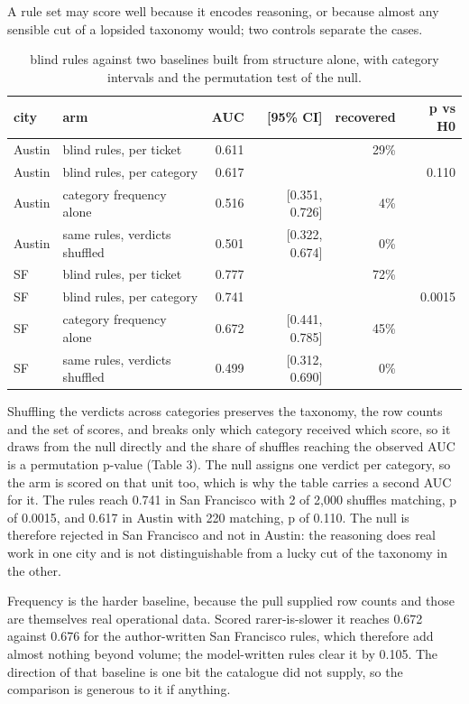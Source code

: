 \documentclass[10pt,a4paper,twocolumn]{article}
\begin{document}
A rule set may score well because it encodes reasoning, or because almost any
sensible cut of a lopsided taxonomy would; two controls separate the cases.

\begin{table}[t]
\centering
\footnotesize
\begin{tabular}{llrrrr}
\toprule
city & arm & AUC & [95\% CI] & recovered & p vs H0 \\
\midrule
Austin & blind rules, per ticket & 0.611 &  & 29\% &  \\
Austin & blind rules, per category & 0.617 &  &  & 0.110 \\
Austin & category frequency alone & 0.516 & [0.351, 0.726] & 4\% &  \\
Austin & same rules, verdicts shuffled & 0.501 & [0.322, 0.674] & 0\% &  \\
SF & blind rules, per ticket & 0.777 &  & 72\% &  \\
SF & blind rules, per category & 0.741 &  &  & 0.0015 \\
SF & category frequency alone & 0.672 & [0.441, 0.785] & 45\% &  \\
SF & same rules, verdicts shuffled & 0.499 & [0.312, 0.690] & 0\% &  \\
\bottomrule
\end{tabular}
\caption{blind rules against two baselines built from structure alone, with category intervals and the permutation test of the null.}
\end{table}

Shuffling the verdicts across categories preserves the taxonomy, the row counts
and the set of scores, and breaks only which category received which score, so
it draws from the null directly and the share of shuffles reaching the observed
AUC is a permutation p-value (Table 3). The null assigns one verdict per
category, so the arm is scored on that unit too, which is why the table carries
a second AUC for it. The rules reach 0.741 in San Francisco with 2 of 2,000
shuffles matching, p of 0.0015, and 0.617 in Austin with 220 matching, p of
0.110. The null is therefore rejected in San Francisco and not in Austin: the
reasoning does real work in one city and is not distinguishable from a lucky cut
of the taxonomy in the other.

Frequency is the harder baseline, because the pull supplied row counts and those
are themselves real operational data. Scored rarer-is-slower it reaches 0.672
against 0.676 for the author-written San Francisco rules, which therefore add
almost nothing beyond volume; the model-written rules clear it by 0.105. The
direction of that baseline is one bit the catalogue did not supply, so the
comparison is generous to it if anything.
\end{document}
